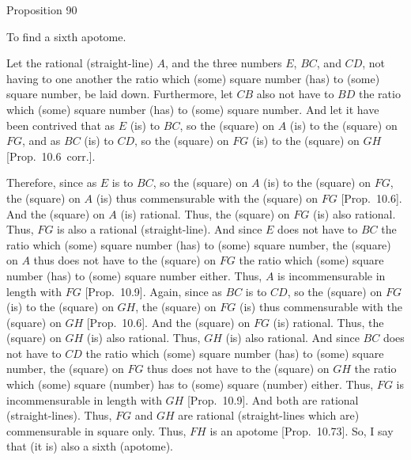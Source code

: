 
\begin{center}
{\large Proposition 90}
\end{center}

To find a sixth apotome.

Let the rational (straight-line) $A$, and the three numbers
$E$, $BC$, and $CD$, not having to one another the ratio which (some)
square  number (has) to (some) square number, be laid down. Furthermore, let $CB$
also not have to $BD$ the ratio which (some) square number (has) to
(some) square number. And let it have been contrived that as $E$
(is) to $BC$, so the (square) on $A$ (is) to the (square) on $FG$,
and as $BC$ (is) to $CD$, so the (square) on $FG$ (is) to the (square)
on $GH$ [Prop.~10.6~corr.].

\epsfysize=1.1in
\centerline{}

Therefore, since as $E$ is to $BC$, so the (square) on $A$ (is)
to the (square) on $FG$, the (square) on $A$ (is) thus commensurable
with the (square) on $FG$ [Prop.~10.6]. 
And the (square) on $A$ (is) rational. Thus, the (square) on $FG$
(is) also rational. Thus, $FG$  is also a rational (straight-line). And
since $E$ does not have to $BC$ the ratio which (some) square
number (has) to (some) square number, the (square) on $A$
thus does not have to the (square) on $FG$ the ratio which (some)
square number (has) to (some) square number either. Thus,
$A$ is incommensurable in length with $FG$ [Prop.~10.9]. Again, since as $BC$ is to $CD$, so
the (square) on $FG$ (is) to the (square) on $GH$, the (square) on
$FG$ (is) thus commensurable with the (square) on $GH$ [Prop.~10.6]. And the (square) on $FG$ (is) rational.
Thus, the (square) on $GH$ (is) also rational. Thus, $GH$
(is) also rational. And since $BC$ does not have to $CD$ the ratio
which (some) square number (has) to (some) square number, the
(square) on $FG$ thus does not have to the (square) on $GH$
the ratio which (some) square (number) has to (some) square (number)
either. Thus, $FG$ is incommensurable in length with $GH$ [Prop.~10.9]. And both are rational (straight-lines).
Thus, $FG$ and $GH$ are rational (straight-lines which are) commensurable
in square only. Thus, $FH$ is an apotome [Prop.~10.73]. So, I say that (it is) also a sixth (apotome).

